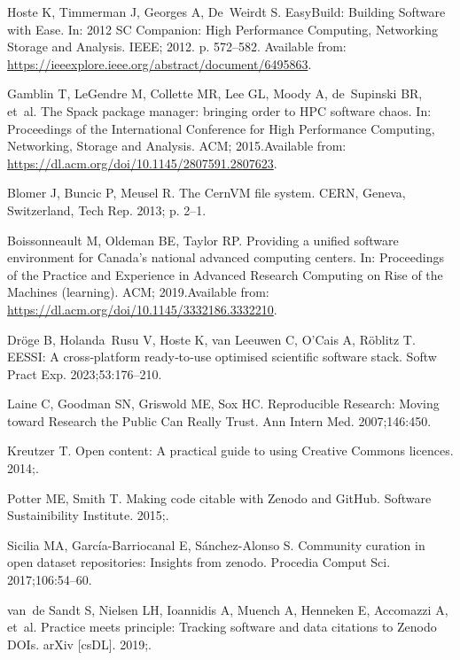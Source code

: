 \documentclass[11pt]{article}
\begin{document}
\begin{thebibliography}{10}
Hoste K, Timmerman J, Georges A, De~Weirdt S.
\newblock EasyBuild: Building Software with Ease.
\newblock In: 2012 SC Companion: High Performance Computing, Networking Storage
  and Analysis. IEEE; 2012. p. 572--582.
\newblock Available from:
  \url{https://ieeexplore.ieee.org/abstract/document/6495863}.

Gamblin T, LeGendre M, Collette MR, Lee GL, Moody A, de~Supinski BR, et~al.
\newblock The Spack package manager: bringing order to {HPC} software chaos.
\newblock In: Proceedings of the International Conference for High Performance
  Computing, Networking, Storage and Analysis. ACM; 2015.Available from:
  \url{https://dl.acm.org/doi/10.1145/2807591.2807623}.

Blomer J, Buncic P, Meusel R.
\newblock The {CernVM} file system.
\newblock CERN, Geneva, Switzerland, Tech Rep. 2013; p. 2--1.

Boissonneault M, Oldeman BE, Taylor RP.
\newblock Providing a unified software environment for Canada's national
  advanced computing centers.
\newblock In: Proceedings of the Practice and Experience in Advanced Research
  Computing on Rise of the Machines (learning). ACM; 2019.Available from:
  \url{https://dl.acm.org/doi/10.1145/3332186.3332210}.

Dröge B, Holanda~Rusu V, Hoste K, van Leeuwen C, O'Cais A, Röblitz T.
\newblock EESSI: A cross‐platform ready‐to‐use optimised scientific
  software stack.
\newblock Softw Pract Exp. 2023;53:176--210.

Laine C, Goodman SN, Griswold ME, Sox HC.
\newblock Reproducible Research: Moving toward Research the Public Can Really
  Trust.
\newblock Ann Intern Med. 2007;146:450.

Kreutzer T.
\newblock Open content: A practical guide to using Creative Commons licences.
  2014;.

Potter ME, Smith T.
\newblock Making code citable with Zenodo and GitHub.
\newblock Software Sustainibility Institute. 2015;.

Sicilia MA, García-Barriocanal E, Sánchez-Alonso S.
\newblock Community curation in open dataset repositories: Insights from
  zenodo.
\newblock Procedia Comput Sci. 2017;106:54--60.

van~de Sandt S, Nielsen LH, Ioannidis A, Muench A, Henneken E, Accomazzi A,
  et~al.
\newblock Practice meets principle: Tracking software and data citations to
  Zenodo DOIs.
\newblock arXiv [csDL]. 2019;.


\end{thebibliography}
\end{document}

